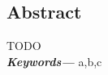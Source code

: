 %
\pagestyle{empty}
\providecommand{\keywords}[1]{\textbf{\textit{Keywords---}} #1}

\subsection*{Abstract}
TODO\\

\keywords{a,b,c}

\cleardoublepage
